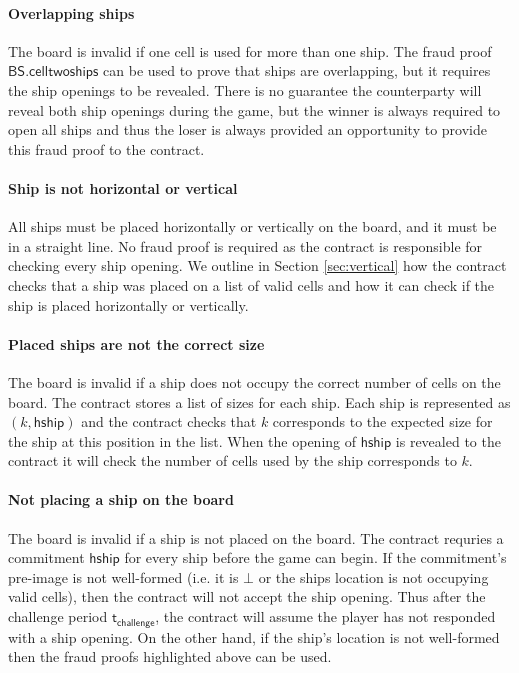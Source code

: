 \documentclass{llncs}
\newcommand{\hship}{\mathsf{hship}}
\newcommand{\battleshiptwoships}{\mathsf{BS.celltwoships}}
\newcommand{\timechallenge}{\mathsf{t}_{\mathsf{challenge}}}
\begin{document}
\paragraph{Overlapping ships}
The board is invalid if one cell is used for more than one ship. 
The fraud proof $\battleshiptwoships$ can be used to prove that ships are overlapping, but it requires the ship openings to be revealed. 
There is no guarantee the counterparty will reveal both ship openings during the game, but the winner is always required to open all ships and thus the loser is always provided an opportunity to provide this fraud proof to the contract. 

\paragraph{Ship is not horizontal or vertical}
All ships must be placed horizontally or vertically on the board, and it must be in a straight line. 
No fraud proof is required as the contract is responsible for checking every ship opening. 
We outline in Section \ref{sec:vertical} how the contract checks that a ship was placed on a list of valid cells and how it can check if the ship is placed horizontally or vertically. 

\paragraph{Placed ships are not the correct size} 
The board is invalid if a ship does not occupy the correct number of cells on the board. 
The contract stores a list of sizes for each ship. 
Each ship is represented as $(k,\hship)$ and the contract checks that $k$ corresponds to the expected size for the ship at this position in the list. 
When the opening of $\hship$ is revealed to the contract it will check the number of cells used by the ship corresponds to $k$. 

\paragraph{Not placing a ship on the board} 
The board is invalid if a ship is not placed on the board. 
The contract requries a commitment $\hship$ for every ship before the game can begin.
If the commitment's pre-image is not well-formed (i.e. it is $\bot$ or the ships location is not occupying valid cells), then the contract will not accept the ship opening.
Thus after the challenge period $\timechallenge$, the contract will assume the player has not responded with a ship opening.
On the other hand, if the ship's location is not well-formed then the fraud proofs highlighted above can be used. 
\end{document}
